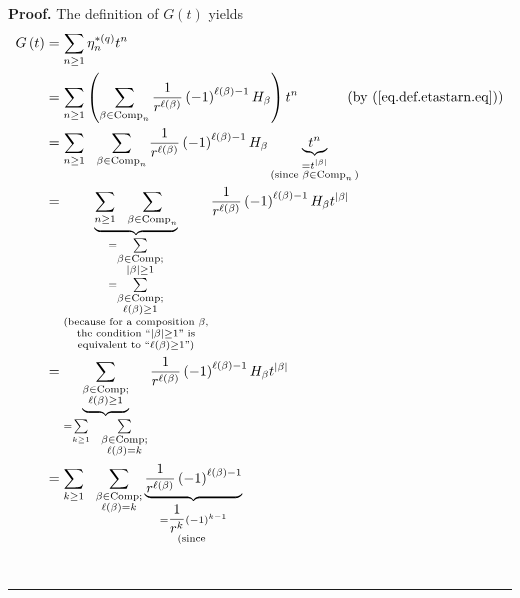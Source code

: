 \documentclass[numbers=enddot,12pt,final,onecolumn,notitlepage]{scrartcl}%
\theoremstyle{definition}
\newenvironment{proof}[1][Proof]{\noindent\textbf{#1.} }{\ \rule{0.5em}{0.5em}}
\let\sumnonlimits\sum
\renewcommand{\sum}{\sumnonlimits\limits}
\begin{document}
\begin{proof}
The definition of $G\left(  t\right)  $ yields%
\begin{align*}
G\left(  t\right)   &  =\sum_{n\geq1}\eta_{n}^{\ast\left(  q\right)  }t^{n}\\
&  =\sum_{n\geq1}\left(  \sum_{\beta\in\operatorname*{Comp}\nolimits_{n}%
}\dfrac{1}{r^{\ell\left(  \beta\right)  }}\left(  -1\right)  ^{\ell\left(
\beta\right)  -1}H_{\beta}\right)  t^{n}\ \ \ \ \ \ \ \ \ \ \left(  \text{by
(\ref{eq.def.etastarn.eq})}\right) \\
&  =\sum_{n\geq1}\ \ \sum_{\beta\in\operatorname*{Comp}\nolimits_{n}}\dfrac
{1}{r^{\ell\left(  \beta\right)  }}\left(  -1\right)  ^{\ell\left(
\beta\right)  -1}H_{\beta}\underbrace{t^{n}}_{\substack{=t^{\left\vert
\beta\right\vert }\\\text{(since }\beta\in\operatorname*{Comp}\nolimits_{n}%
\text{)}}}\\
&  =\underbrace{\sum_{n\geq1}\ \ \sum_{\beta\in\operatorname*{Comp}%
\nolimits_{n}}}_{\substack{=\sum_{\substack{\beta\in\operatorname*{Comp}%
;\\\left\vert \beta\right\vert \geq1}}\\=\sum_{\substack{\beta\in
\operatorname*{Comp};\\\ell\left(  \beta\right)  \geq1}}\\\text{(because for a
composition }\beta\text{,}\\\text{the condition \textquotedblleft}\left\vert
\beta\right\vert \geq1\text{\textquotedblright\ is}\\\text{equivalent to
\textquotedblleft}\ell\left(  \beta\right)  \geq1\text{\textquotedblright)}%
}}\dfrac{1}{r^{\ell\left(  \beta\right)  }}\left(  -1\right)  ^{\ell\left(
\beta\right)  -1}H_{\beta}t^{\left\vert \beta\right\vert }\\
&  =\underbrace{\sum_{\substack{\beta\in\operatorname*{Comp};\\\ell\left(
\beta\right)  \geq1}}}_{=\sum_{k\geq1}\ \ \sum_{\substack{\beta\in
\operatorname*{Comp};\\\ell\left(  \beta\right)  =k}}}\dfrac{1}{r^{\ell\left(
\beta\right)  }}\left(  -1\right)  ^{\ell\left(  \beta\right)  -1}H_{\beta
}t^{\left\vert \beta\right\vert }\\
&  =\sum_{k\geq1}\ \ \sum_{\substack{\beta\in\operatorname*{Comp}%
;\\\ell\left(  \beta\right)  =k}}\underbrace{\dfrac{1}{r^{\ell\left(
\beta\right)  }}\left(  -1\right)  ^{\ell\left(  \beta\right)  -1}%
}_{\substack{=\dfrac{1}{r^{k}}\left(  -1\right)  ^{k-1}\\\text{(since }%
}}
\end{align*}
\end{proof}
\end{document}
